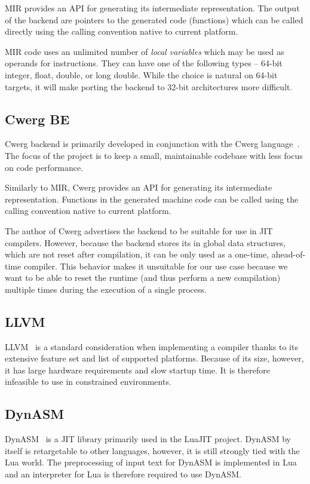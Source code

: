 MIR provides an API for generating its intermediate representation. The output of the backend are pointers to the generated code (functions) which can be called directly using the calling convention native to current platform.

MIR code uses an unlimited number of \textit{local variables} which may be used as operands for instructions. They can have one of the following types -- 64-bit integer, float, double, or long double. While the choice is natural on 64-bit targets, it will make porting the backend to 32-bit architectures more difficult.


\subsection{Cwerg BE}

Cwerg backend is primarily developed in conjunction with the Cwerg language~\cite{cwerg}. The focus of the project is to keep a small, maintainable codebase with less focus on code performance.

Similarly to MIR, Cwerg provides an API for generating its intermediate representation. Functions in the generated machine code can be called using the calling convention native to current platform.

The author of Cwerg advertises the backend to be suitable for use in JIT compilers. However, because the backend stores its in global data structures, which are not reset after compilation, it can be only used as a one-time, ahead-of-time compiler. This behavior makes it unsuitable for our use case because we want to be able to reset the runtime (and thus perform a new compilation) multiple times during the execution of a single process.


\subsection{LLVM}

LLVM~\cite{llvm} is a standard consideration when implementing a compiler thanks to its extensive feature set and list of supported platforms. Because of its size, however, it has large hardware requirements and slow startup time. It is therefore infeasible to use in constrained environments.


\subsection{DynASM}

DynASM~\cite{dynasm} is a JIT library primarily used in the LuaJIT project. DynASM by itself is retargetable to other languages, however, it is still strongly tied with the Lua world. The preprocessing of input text for DynASM is implemented in Lua and an interpreter for Lua is therefore required to use DynASM.

